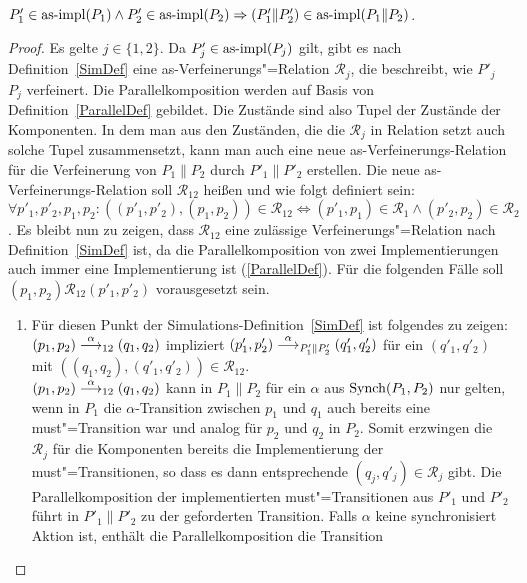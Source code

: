 \begin{Lem}\mbox{}\\
  \label{impParallelLem}
  $P'_1\in\mathrm{as}\text{-}\mathrm{impl} (P_1) \land P'_2 \in\mathrm{as}\text{-}\mathrm{impl} (P_2) \Rightarrow (P'_1\|P'_2)
  \in\mathrm{as}\text{-}\mathrm{impl} (P_1\|P_2)$.
\end{Lem}
\begin{proof}
  Es gelte $j\in\{1,2\}$. Da $P'_j\in\mathrm{as}\text{-}\mathrm{impl} (P_j)$ gilt, gibt es nach
  Definition~\ref{SimDef} eine as-Verfeinerungs"=Relation $\mathcal{R}_j$, die
  beschreibt, wie $P'_j$ $P_j$ verfeinert. Die Parallelkomposition werden
  auf Basis von Definition~\ref{ParallelDef} gebildet. Die Zustände sind also
  Tupel der Zustände der Komponenten. In dem man aus den Zuständen, die die
  $\mathcal{R}_j$ in Relation setzt auch solche Tupel zusammensetzt, kann man
  auch eine neue as-Verfeinerungs-Relation für die Verfeinerung von $P_1\|P_2$
  durch $P'_1\|P'_2$ erstellen. Die neue as-Verfeinerungs-Relation soll
  $\mathcal{R}_{12}$ heißen und wie folgt definiert sein:
  $\forall p'_1,p'_2,p_1,p_2: ((p'_1,p'_2),(p_1,p_2))\in\mathcal{R}_{12}
  \Leftrightarrow (p'_1,p_1)\in\mathcal{R}_1 \land (p'_2,p_2)\in\mathcal{R}_2$.
  Es bleibt nun zu zeigen, dass $\mathcal{R}_{12}$ eine zulässige
  Verfeinerungs"=Relation nach Definition~\ref{SimDef} ist, da die
  Parallelkomposition von zwei Implementierungen auch immer eine
  Implementierung ist (\ref{ParallelDef}). Für die folgenden Fälle soll
  $(p_1,p_2)\mathcal{R}_{12}(p'_1,p'_2)$ vorausgesetzt sein.
  \begin{enumerate}
    \item Für diesen Punkt der Simulations-Definition~\ref{SimDef} ist
      folgendes zu zeigen: $(p_1,p_2)\must[\alpha]_{12}(q_1,q_2)$ impliziert
      $(p'_1,p'_2)\must[\alpha]_{P'_1\|P'_2}(q'_1,q'_2)$ für ein $(q'_1,q'_2)$
      mit $((q_1,q_2),(q'_1,q'_2))\in\mathcal{R}_{12}$.\\
      $(p_1,p_2)\must[\alpha]_{12}(q_1,q_2)$ kann in $P_1\|P_2$ für ein
      $\alpha$ aus $\mathrm{Synch} (P_1,P_2)$ nur gelten, wenn in $P_1$ die
      $\alpha$-Transition zwischen $p_1$ und $q_1$ auch bereits eine
      must"=Transition war und analog für $p_2$ und $q_2$ in $P_2$. Somit
      erzwingen die $\mathcal{R}_j$ für die Komponenten bereits die
      Implementierung der must"=Transitionen, so dass es dann entsprechende
      $(q_j,q'_j)\in\mathcal{R}_j$ gibt. Die Parallelkomposition der
      implementierten must"=Transitionen aus $P'_1$ und $P'_2$ führt in
      $P'_1\|P'_2$ zu der geforderten Transition. Falls $\alpha$ keine
      synchronisiert Aktion ist, enthält die Parallelkomposition die Transition

\end{enumerate}
\end{proof}
